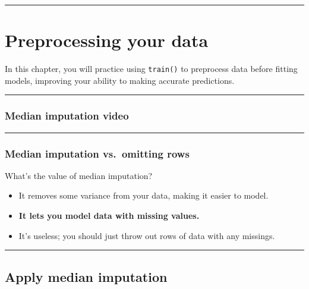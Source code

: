 \documentclass[]{book}
\begin{document}
\begin{center}\rule{0.5\linewidth}{\linethickness}\end{center}

\chapter{Preprocessing your data}\label{preprocessing-your-data}

In this chapter, you will practice using \texttt{train()} to preprocess
data before fitting models, improving your ability to making accurate
predictions.

\begin{center}\rule{0.5\linewidth}{\linethickness}\end{center}

\subsection*{Median imputation video}\label{median-imputation-video}

\begin{center}\rule{0.5\linewidth}{\linethickness}\end{center}

\subsection*{Median imputation vs.~omitting
rows}\label{median-imputation-vs.omitting-rows}

What's the value of median imputation?

\begin{itemize}
\item
  It removes some variance from your data, making it easier to model.
\item
  \textbf{It lets you model data with missing values.}
\item
  It's useless; you should just throw out rows of data with any
  missings.
\end{itemize}

\begin{center}\rule{0.5\linewidth}{\linethickness}\end{center}

\section{Apply median imputation}\label{apply-median-imputation}
\end{document}
